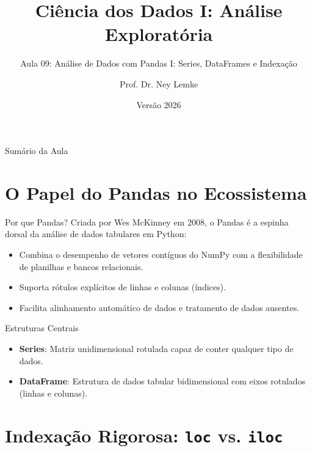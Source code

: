 \documentclass[aspectratio=169, 10pt]{beamer}
\title[Aula 09 - Pandas I]{Ciência dos Dados I: Análise Exploratória}
\subtitle{Aula 09: Análise de Dados com Pandas I: Series, DataFrames e Indexação}
\author{Prof. Dr. Ney Lemke}
\institute{UNESP -- Instituto de Biociências de Botucatu}
\date{Versão 2026}
\begin{document}
\frame{\titlepage}

\begin{frame}{Sumário da Aula}
  \tableofcontents
\end{frame}

\section{O Papel do Pandas no Ecossistema}

\begin{frame}{Por que Pandas?}
  Criada por Wes McKinney em 2008, o Pandas é a espinha dorsal da análise de dados tabulares em Python:
  \begin{itemize}
    \item Combina o desempenho de vetores contíguos do NumPy com a flexibilidade de planilhas e bancos relacionais.
    \item Suporta rótulos explícitos de linhas e colunas (índices).
    \item Facilita alinhamento automático de dados e tratamento de dados ausentes.
  \end{itemize}
  \begin{block}{Estruturas Centrais}
    \begin{itemize}
      \item \textbf{Series}: Matriz unidimensional rotulada capaz de conter qualquer tipo de dados.
      \item \textbf{DataFrame}: Estrutura de dados tabular bidimensional com eixos rotulados (linhas e colunas).
    \end{itemize}
  \end{block}
\end{frame}

\section{Indexação Rigorosa: \texttt{loc} vs. \texttt{iloc}}
\end{document}

